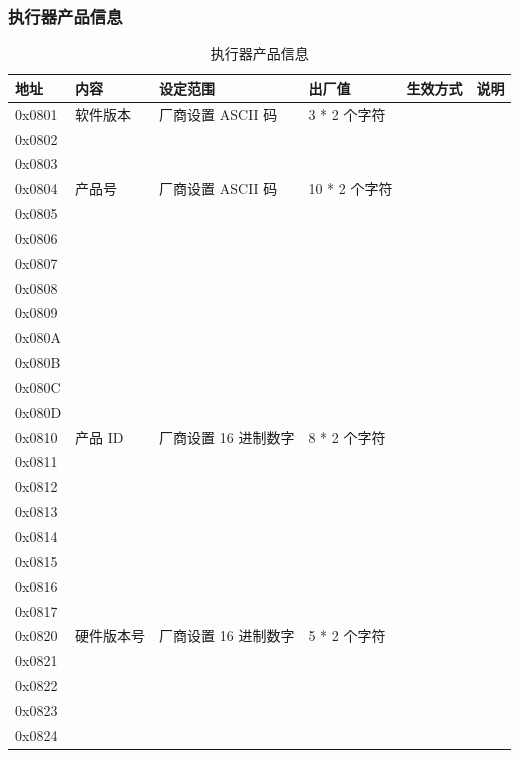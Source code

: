 \documentclass[UTF8]{ctexart}
\begin{document}
\subsubsection{执行器产品信息}
\begin{table}[h]
\centering
\caption{执行器产品信息}
\label{tab:product_information}
\begin{tabular}{|l|l|l|l|l|l|}
\hline
\textbf{地址} & \textbf{内容} & \textbf{设定范围} & \textbf{出厂值} & \textbf{生效方式} & \textbf{说明} \\ \hline
0x0801 & 软件版本 & 厂商设置 ASCII 码 & 3 * 2 个字符 &  &  \\ \hline
0x0802 &  &  &  &  &  \\ \hline
0x0803 &  &  &  &  &  \\ \hline
0x0804 & 产品号 & 厂商设置 ASCII 码 & 10 * 2 个字符 &  &  \\ \hline
0x0805 &  &  &  &  &  \\ \hline
0x0806 &  &  &  &  &  \\ \hline
0x0807 &  &  &  &  &  \\ \hline
0x0808 &  &  &  &  &  \\ \hline
0x0809 &  &  &  &  &  \\ \hline
0x080A &  &  &  &  &  \\ \hline
0x080B &  &  &  &  &  \\ \hline
0x080C &  &  &  &  &  \\ \hline
0x080D &  &  &  &  &  \\ \hline
0x0810 & 产品 ID & 厂商设置 16 进制数字 & 8 * 2 个字符 &  &  \\ \hline
0x0811 &  &  &  &  &  \\ \hline
0x0812 &  &  &  &  &  \\ \hline
0x0813 &  &  &  &  &  \\ \hline
0x0814 &  &  &  &  &  \\ \hline
0x0815 &  &  &  &  &  \\ \hline
0x0816 &  &  &  &  &  \\ \hline
0x0817 &  &  &  &  &  \\ \hline
0x0820 & 硬件版本号 & 厂商设置 16 进制数字 & 5 * 2 个字符 &  &  \\ \hline
0x0821 &  &  &  &  &  \\ \hline
0x0822 &  &  &  &  &  \\ \hline
0x0823 &  &  &  &  &  \\ \hline
0x0824 &  &  &  &  &  \\ \hline
\end{tabular}
\end{table}
\end{document}
